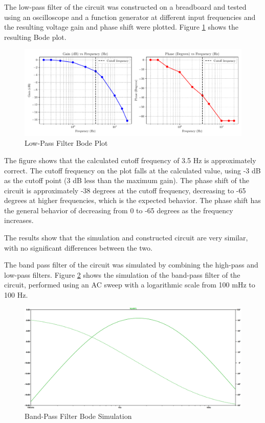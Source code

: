 \documentclass[CMPE]{KGCOEReport}
\begin{document}
The low-pass filter of the circuit was constructed on a breadboard and tested using an oscilloscope and a function generator at different input frequencies and the resulting voltage gain and phase shift were plotted. Figure \ref{fig:lowPassBode} shows the resulting Bode plot.

\begin{figure}[H]
    \centering
    \includegraphics[width=1\textwidth]{low_pass_plot.pdf}
    \caption{Low-Pass Filter Bode Plot}
    \label{fig:lowPassBode}
\end{figure}

The figure shows that the calculated cutoff frequency of 3.5 Hz is approximately correct. The cutoff frequency on the plot falls at the calculated value, using -3 dB as the cutoff point (3 dB less than the maximum gain). The phase shift of the circuit is approximately -38 degrees at the cutoff frequency, decreasing to -65 degrees at higher frequencies, which is the expected behavior. The phase shift has the general behavior of decreasing from 0 to -65 degrees as the frequency increases.

The results show that the simulation and constructed circuit are very similar, with no significant differences between the two.

\bigskip

The band pass filter of the circuit was simulated by combining the high-pass and low-pass filters. Figure \ref{fig:bandPassSim} shows the simulation of the band-pass filter of the circuit, performed using an AC sweep with a logarithmic scale from 100 mHz to 100 Hz.

\begin{figure}[H]
    \centering
    \includegraphics[width=1\textwidth]{SimFreqBandPass.png}
    \caption{Band-Pass Filter Bode Simulation}
    \label{fig:bandPassSim}
\end{figure}
\end{document}
